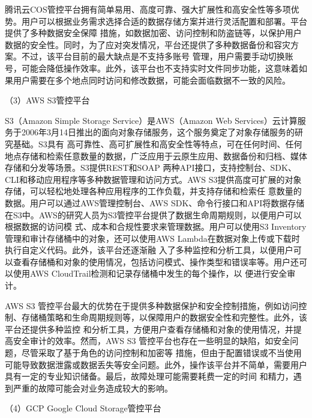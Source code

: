腾讯云COS管控平台拥有简单易用、高度可靠、强大扩展性和高安全性等多项优势\cite{yuxiao}。用户可以根据业务需求选择合适的数据存储方案并进行灵活配置和部署。平台提供了多种数据安全保障
措施，如数据加密、访问控制和防盗链等，以保护用户数据的安全性。同时，为了应对突发情况，平台还提供了多种数据备份和容灾方案。不过，该平台目前的最大缺点是不支持多账号
管理，用户需要手动切换账号，可能会降低操作效率。此外，该平台也不支持实时文件同步功能，这意味着如果用户需要在多个地点同时访问和修改数据，可能会面临数据不一致的风险。


（3）AWS S3管控平台


S3（Amazon Simple Storage Service）是AWS（Amazon Web Services）云计算服务于2006年3月14日推出的面向对象存储服务\cite{y2xiao}，这个服务奠定了对象存储服务的研究基础。S3具有
高可靠性、高可扩展性和高安全性等特点，可在任何时间、任何地点存储和检索任意数量的数据，广泛应用于云原生应用、数据备份和归档、媒体存储和分发等场景。S3提供REST和SOAP
两种API接口，支持控制台、SDK、CLI和移动应用程序等多种数据管理和访问方式\cite{desmarais1992carbon}。AWS S3提供高度可扩展的对象存储，可以轻松地处理各种应用程序的工作负载，并支持存储和检索任
意数量的数据。用户可以通过AWS管理控制台、AWS SDK、命令行接口和API将数据存储在S3中。AWS的研究人员为S3管控平台提供了数据生命周期规则，以便用户可以根据数据的访问模
式、成本和合规性要求来管理数据。用户可以使用S3 Inventory管理和审计存储桶中的对象，还可以使用AWS Lambda在数据对象上传或下载时执行自定义代码。此外，该平台还逐渐融
入了多种监控和分析工具，以便用户可以查看存储桶和对象的使用情况，包括访问模式、操作类型和错误率等。用户还可以使用AWS CloudTrail检测和记录存储桶中发生的每个操作，以
便进行安全审计\cite{kongqingyong2eji}。


AWS S3 管控平台最大的优势在于提供多种数据保护和安全控制措施，例如访问控制、存储桶策略和生命周期规则等\cite{kong2ngyong2eji}，以保障用户的数据安全性和完整性。此外，该平台还提供多种监控
和分析工具，方便用户查看存储桶和对象的使用情况，并提高安全审计的效率。然而，AWS S3 管控平台也存在一些明显的缺陷，如安全问题，尽管采取了基于角色的访问控制和加密等
措施，但由于配置错误或不当使用可能导致数据泄露或数据丢失等安全问题。此外，操作该平台并不简单，需要用户具有一定的专业知识储备。最后，故障处理可能需要耗费一定的时间
和精力，遇到严重的故障可能会对业务造成较大的影响。

（4）GCP Google Cloud Storage管控平台

